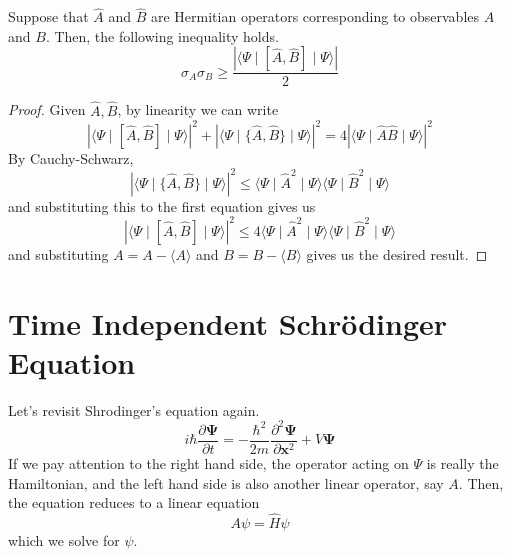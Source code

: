 \documentclass{article}
\begin{document}
    \begin{theorem}
      Suppose that $\hat{A}$ and $\hat{B}$ are Hermitian operators corresponding to observables $A$ and $B$. Then, the following inequality holds. 
      \begin{equation} 
        \sigma_A \sigma_B \geq \frac{|\langle \Psi \mid [\hat{A}, \hat{B}] \mid \Psi \rangle |}{2}
      \end{equation}
    \end{theorem}
    \begin{proof} 
      Given $\hat{A}, \hat{B}$, by linearity we can write 
      \begin{equation} 
        |\langle \Psi \mid [\hat{A}, \hat{B}] \mid \Psi \rangle |^2 + | \langle \Psi \mid \{\hat{A}, \hat{B} \} \mid \Psi \rangle |^2 = 4 | \langle \Psi \mid \hat{A} \hat{B} \mid \Psi \rangle |^2
      \end{equation}
      By Cauchy-Schwarz, 
      \begin{equation} 
        | \langle \Psi \mid \{\hat{A}, \hat{B} \} \mid \Psi \rangle |^2 \leq \langle \Psi \mid \hat{A}^2 \mid \Psi \rangle \langle \Psi \mid \hat{B}^2 \mid \Psi \rangle 
      \end{equation} 
      and substituting this to the first equation gives us 
      \begin{equation} 
        |\langle \Psi \mid [\hat{A}, \hat{B}] \mid \Psi \rangle |^2 \leq 4 \langle \Psi \mid \hat{A}^2 \mid \Psi \rangle \langle \Psi \mid \hat{B}^2 \mid \Psi \rangle 
      \end{equation}
      and substituting $A = A - \langle A \rangle$ and $B = B - \langle B \rangle$ gives us the desired result. 
    \end{proof}


 
\section{Time Independent Schr\"odinger Equation}

  Let's revisit Shrodinger's equation again. 
  \begin{equation} 
    i \hbar \frac{\partial \boldsymbol{\Psi}}{\partial t} = - \frac{\hbar^2}{2m} \frac{\partial^2 \boldsymbol{\Psi}}{\partial \mathbf{x}^2} + V \boldsymbol{\Psi}
  \end{equation}
  If we pay attention to the right hand side, the operator acting on $\Psi$ is really the Hamiltonian, and the left hand side is also another linear operator, say $A$. Then, the equation reduces to a linear equation 
  \begin{equation} 
    A \psi = \hat{H} \psi
  \end{equation}
  which we solve for $\psi$. 
\end{document}
